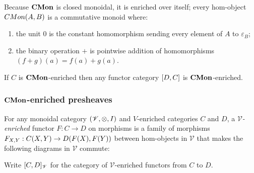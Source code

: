 Because $\mathbf{CMon}$ is closed monoidal, it is enriched over itself; every hom-object ${CMon}(A,B)$ is a
commutative monoid where:

\begin{enumerate}
\item the unit $0$ is the constant homomorphism sending every element of $A$ to $\varepsilon_B$;
\item the binary operation $+$ is pointwise addition of homomorphisms $(f + g)(a) = f(a) + g(a)$.
\end{enumerate}

\begin{proposition}
If $C$ is $\mathbf{CMon}$-enriched then any functor category $[D,C]$ is $\mathbf{CMon}$-enriched.
\end{proposition}

\subsubsection{$\mathbf{CMon}$-enriched presheaves}

\begin{definition}
For any monoidal category $(\mathscr{V}, \otimes, I)$ and $V$-enriched categories $C$ and $D$, a
\emph{$\mathscr{V}$-enriched} functor $F: C \to D$ on morphisms is a family of morphisms $F_{X,Y}:
{C}(X,Y) \to {D}(F(X),F(Y))$ between hom-objects in $\mathscr{V}$ that makes the following diagrams
in $\mathscr{V}$ commute:

\begin{center}
\hspace{5mm}
\end{center}
\end{definition}

Write $[C,D]_{\mathscr{V}}$ for the category of $\mathscr{V}$-enriched functors from $C$ to $D$.

